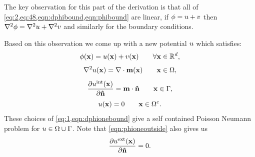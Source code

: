 The key observation for this part of the derivation is that all of \cref{eq:2,eq:48,eqn:dphibound,eqn:phibound} are linear, \ie if $\phi = u + v$ then $\nabla^2 \phi = \nabla^2 u + \nabla^2 v$ and similarly for the boundary conditions.




Based on this observation we come up with a new potential $u$ which satisfies:
\begin{equation}
  \phi(\boldsymbol{\mathrm{x}}) = u(\boldsymbol{\mathrm{x}}) + v(\boldsymbol{\mathrm{x}}) \qquad \forall \boldsymbol{\mathrm{x}} \in {\mathbb{R}^d},
  \label{eq:21}
\end{equation}
\begin{equation}
  \nabla^2 u(\boldsymbol{\mathrm{x}}) = \nabla \cdot \boldsymbol{\mathrm{m}}(\boldsymbol{\mathrm{x}}) \qquad \boldsymbol{\mathrm{x}} \in \Omega,
  \label{eq:1}
\end{equation}
\begin{equation}
  \frac{\partial u^{\mathrm{int}}(\boldsymbol{\mathrm{x}})}{\partial \boldsymbol{\mathrm{\hat{n}}}} = \boldsymbol{\mathrm{m}} \cdot \boldsymbol{\mathrm{\hat{n}}} \qquad \boldsymbol{\mathrm{x}} \in {\Gamma},
  \label{eqn:dphionebound}
\end{equation}
\begin{equation}
  u(\boldsymbol{\mathrm{x}}) = 0 \qquad \boldsymbol{\mathrm{x}} \in {\Omega^c}.
  \label{eqn:phioneoutside}
\end{equation}
These choices of \cref{eq:1,eqn:dphionebound} give a self contained Poisson Neumann problem for $u \in \Omega \cup {\Gamma}$.
Note that \cref {eqn:phioneoutside} also gives us
\begin{equation}
  \frac{\partial u^{\mathrm{ext}}(\boldsymbol{\mathrm{x}})}{\partial \boldsymbol{\mathrm{\hat{n}}}} = 0.
  \label{eq:32}
\end{equation}


